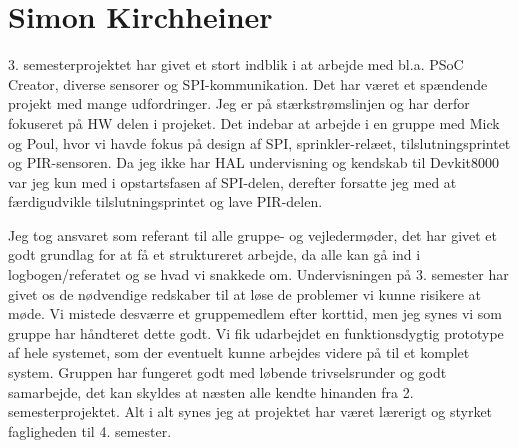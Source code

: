 \section{Simon Kirchheiner}
3. semesterprojektet har givet et stort indblik i at arbejde med bl.a. PSoC Creator, diverse sensorer og SPI-kommunikation. Det har været et spændende projekt med mange udfordringer. Jeg er på stærkstrømslinjen og har derfor fokuseret på HW delen i projeket. Det indebar at arbejde i en gruppe med Mick og Poul, hvor vi havde fokus på design af SPI, sprinkler-relæet, tilslutningsprintet og PIR-sensoren. Da jeg ikke har HAL undervisning og kendskab til Devkit8000 var jeg kun med i opstartsfasen af SPI-delen, derefter forsatte jeg med at færdigudvikle tilslutningsprintet og lave PIR-delen.

Jeg tog ansvaret som referant til alle gruppe- og vejledermøder, det har givet et godt grundlag for at få et struktureret arbejde, da alle kan gå ind i logbogen/referatet og se hvad vi snakkede om. Undervisningen på 3. semester har givet os de nødvendige redskaber til at løse de problemer vi kunne risikere at møde. Vi mistede desværre et gruppemedlem efter korttid, men jeg synes vi som gruppe har håndteret dette godt.
Vi fik udarbejdet en funktionsdygtig prototype af hele systemet, som der eventuelt kunne arbejdes videre på til et komplet system. Gruppen har fungeret godt med løbende trivselsrunder og godt samarbejde, det kan skyldes at næsten alle kendte hinanden fra 2. semesterprojektet. Alt i alt synes jeg at projektet har været lærerigt og styrket fagligheden til 4. semester. 